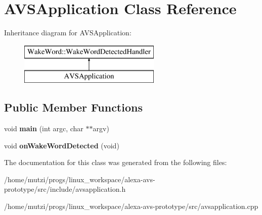 \hypertarget{classAVSApplication}{}\section{A\+V\+S\+Application Class Reference}
\label{classAVSApplication}
Inheritance diagram for A\+V\+S\+Application\+:\begin{figure}[H]
\begin{center}
\leavevmode
\includegraphics[height=2.000000cm]{d1/d36/classAVSApplication}
\end{center}
\end{figure}
\subsection*{Public Member Functions}
\begin{DoxyCompactItemize}
\item 
\mbox{\label{classAVSApplication_a5f2565c654e3393cf1a1fe0787355b6d}} 
void {\bfseries main} (int argc, char $\ast$$\ast$argv)
\item 
\mbox{\label{classAVSApplication_a984f8e6e0d116c6adaef971a963ece5d}} 
void {\bfseries on\+Wake\+Word\+Detected} (void)
\end{DoxyCompactItemize}


The documentation for this class was generated from the following files\+:\begin{DoxyCompactItemize}
\item 
/home/mutzi/progs/linux\+\_\+workspace/alexa-\/avs-\/prototype/src/include/avsapplication.\+h\item 
/home/mutzi/progs/linux\+\_\+workspace/alexa-\/avs-\/prototype/src/avsapplication.\+cpp\end{DoxyCompactItemize}

